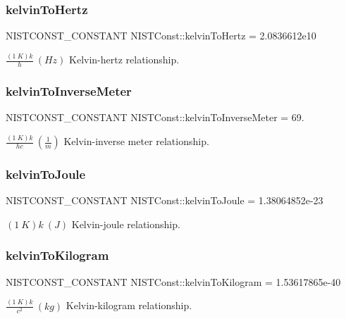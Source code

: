 \subsubsection{\texorpdfstring{kelvin\+To\+Hertz}{kelvinToHertz}}
{\footnotesize\ttfamily N\+I\+S\+T\+C\+O\+N\+S\+T\+\_\+\+C\+O\+N\+S\+T\+A\+NT N\+I\+S\+T\+Const\+::kelvin\+To\+Hertz = 2.\+0836612e10}

$\frac{(1\ K)k}{h} \ (Hz)$ Kelvin-\/hertz relationship. \mbox{\label{group___n_i_s_t_const-_kelvin_ga7c76d99ebcba19f9c15c6dc96282576b}} 
\subsubsection{\texorpdfstring{kelvin\+To\+Inverse\+Meter}{kelvinToInverseMeter}}
{\footnotesize\ttfamily N\+I\+S\+T\+C\+O\+N\+S\+T\+\_\+\+C\+O\+N\+S\+T\+A\+NT N\+I\+S\+T\+Const\+::kelvin\+To\+Inverse\+Meter = 69.}

$\frac{(1\ K)k}{hc} \ (\frac{1}{m})$ Kelvin-\/inverse meter relationship. \mbox{\label{group___n_i_s_t_const-_kelvin_ga2257299cf7bd7dd841a7325e47a67907}} 
\subsubsection{\texorpdfstring{kelvin\+To\+Joule}{kelvinToJoule}}
{\footnotesize\ttfamily N\+I\+S\+T\+C\+O\+N\+S\+T\+\_\+\+C\+O\+N\+S\+T\+A\+NT N\+I\+S\+T\+Const\+::kelvin\+To\+Joule = 1.\+38064852e-\/23}

$(1\ K)k \ (J)$ Kelvin-\/joule relationship. \mbox{\label{group___n_i_s_t_const-_kelvin_gad28887701d9265b5489c4deaabee8deb}} 
\subsubsection{\texorpdfstring{kelvin\+To\+Kilogram}{kelvinToKilogram}}
{\footnotesize\ttfamily N\+I\+S\+T\+C\+O\+N\+S\+T\+\_\+\+C\+O\+N\+S\+T\+A\+NT N\+I\+S\+T\+Const\+::kelvin\+To\+Kilogram = 1.\+53617865e-\/40}

$\frac{(1\ K)k}{c^2} \ (kg)$ Kelvin-\/kilogram relationship. 